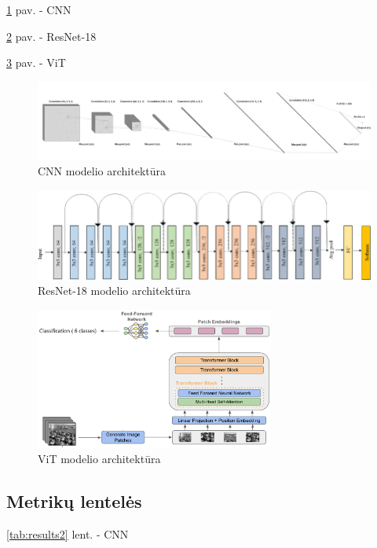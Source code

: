 \documentclass[conference]{IEEEtran}
\begin{document}
\ref{fig1} pav. - CNN 

\ref{fig2} pav. - ResNet-18 

\ref{fig3} pav. - ViT 

\begin{figure}[p]
    \centering
    \includegraphics[width=\textwidth]{cnn.png}
    \caption{CNN modelio architektūra}
    \label{fig1}
\end{figure}

\begin{figure}[p] 
    \centering
    \includegraphics[width=\textwidth]{resnet.png}
    \caption{ResNet-18 modelio architektūra}
    \label{fig2}
\end{figure}

\begin{figure}[p]
    \centering
    \includegraphics[width=0.7\textwidth]{vit.png}
    \caption{ViT modelio architektūra}
    \label{fig3}
\end{figure}

\subsection{Metrikų lentelės}

\ref{tab:results2} lent. - CNN 
\end{document}
